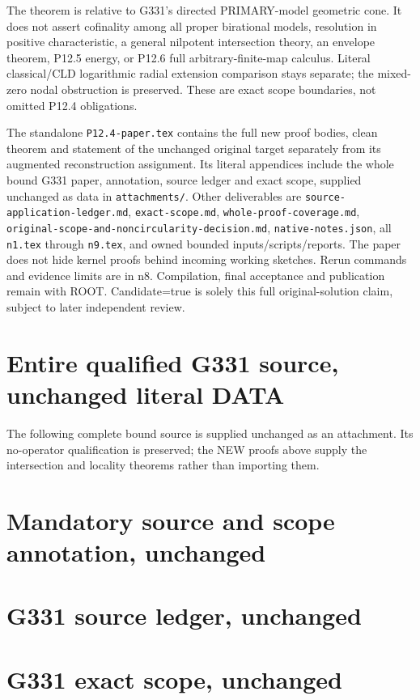 \documentclass[11pt]{article}
\begin{document}
The theorem is relative to G331's directed PRIMARY-model geometric cone. It does not assert cofinality among all proper birational models, resolution in positive characteristic, a general nilpotent intersection theory, an envelope theorem, P12.5 energy, or P12.6 full arbitrary-finite-map calculus. Literal classical/CLD logarithmic radial extension comparison stays separate; the mixed-zero nodal obstruction is preserved. These are exact scope boundaries, not omitted P12.4 obligations.

The standalone \texttt{P12.4-paper.tex} contains the full new proof bodies, clean theorem and statement of the unchanged original target separately from its augmented reconstruction assignment. Its literal appendices include the whole bound G331 paper, annotation, source ledger and exact scope, supplied unchanged as data in \texttt{attachments/}. Other deliverables are \texttt{source-application-ledger.md}, \texttt{exact-scope.md}, \texttt{whole-proof-coverage.md}, \texttt{original-scope-and-noncircularity-decision.md}, \texttt{native-notes.json}, all \texttt{n1.tex} through \texttt{n9.tex}, and owned bounded inputs/scripts/reports. The paper does not hide kernel proofs behind incoming working sketches. Rerun commands and evidence limits are in n8. Compilation, final acceptance and publication remain with ROOT. Candidate=true is solely this full original-solution claim, subject to later independent review.

\appendix
\section{Entire qualified G331 source, unchanged literal DATA}
The following complete bound source is supplied unchanged as an attachment.
Its no-operator qualification is preserved; the NEW proofs above supply the
intersection and locality theorems rather than importing them.
\section{Mandatory source and scope annotation, unchanged}
\section{G331 source ledger, unchanged}
\section{G331 exact scope, unchanged}
\end{document}
